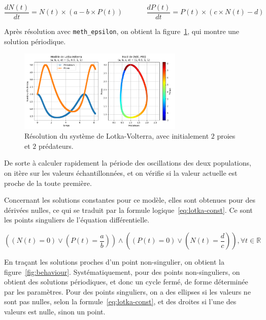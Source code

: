 \begin{equation}
	\label{eq:lotka}
	\frac{dN(t)}{dt} = N(t) \times (a - b \times P(t)) \ \ \ \ \ \ \ \ \ \ \ \ \ \ \
	\frac{dP(t)}{dt} = P(t) \times (c \times N(t) - d)
\end{equation}

Après résolution avec \texttt{meth\_epsilon}, on obtient la figure~\ref{fig:lotka}, qui montre une solution périodique.

\begin{figure}[htbp!]
	\centering
	\includegraphics[width=0.7\textwidth]{res/lotka}
	\caption{Résolution du système de Lotka-Volterra, avec initialement $2$ proies et $2$ prédateurs.}
	\label{fig:lotka}
\end{figure}

De sorte à calculer rapidement la période des oscillations des deux populations, on itère
sur les valeurs échantillonnées, et on vérifie si la valeur actuelle est proche de la toute première.

Concernant les solutions constantes pour ce modèle, elles sont obtenues pour des dérivées nulles,
ce qui se traduit par la formule logique~\ref{eq:lotka-const}. Ce sont les points singuliers
de l'équation différentielle.

\begin{equation}
	\label{eq:lotka-const}
	\left(\left(N(t) = 0\right) \vee \left(P(t) = \frac{a}{b}\right)\right)
	\wedge
	\left(\left(P(t) = 0\right) \vee \left(N(t) = \frac{d}{c}\right)\right), \forall t \in \mathbb{R}
\end{equation}

En traçant les solutions proches d'un point non-singulier, on obtient la figure~\ref{fig:behaviour}. Systématiquement,
pour des points non-singuliers, on obtient des solutions périodiques, et donc un cycle fermé, de forme déterminée par les paramètres.
Pour des points singuliers, on a des ellipses si les valeurs ne sont pas nulles, selon la formule~\ref{eq:lotka-const},
et des droites si l'une des valeurs est nulle, sinon un point.

